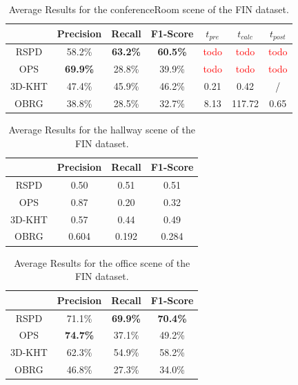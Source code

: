 \documentclass[main.tex]{subfiles}
\begin{document}
\begin{table}[]
    \centering
    \begin{tabular}{c|cccccc}
               & Precision       & Recall          & F1-Score        & $t_{pre}$             & $t_{calc}$            & $t_{post}$            \\ \hline
        RSPD   & 58.2\%          & \textbf{63.2\%} & \textbf{60.5\%} & \textcolor{red}{todo} & \textcolor{red}{todo} & \textcolor{red}{todo} \\
        OPS    & \textbf{69.9\%} & 28.8\%          & 39.9\%          & \textcolor{red}{todo} & \textcolor{red}{todo} & \textcolor{red}{todo} \\
        3D-KHT & 47.4\%          & 45.9\%          & 46.2\%          & 0.21                  & 0.42                  & /                     \\
        OBRG   & 38.8\%          & 28.5\%          & 32.7\%          & 8.13                  & 117.72                & 0.65
    \end{tabular}%
    \caption{Average Results for the conferenceRoom scene of the FIN dataset.}
    \label{tab:res-fin-conf}
\end{table}

\begin{table}[]
    \centering
    \begin{tabular}{c|ccc}
               & Precision & Recall & F1-Score \\ \hline
        RSPD   & 0.50      & 0.51   & 0.51     \\
        OPS    & 0.87      & 0.20   & 0.32     \\
        3D-KHT & 0.57      & 0.44   & 0.49     \\
        OBRG   & 0.604     & 0.192  & 0.284
    \end{tabular}%
    \caption{Average Results for the hallway scene of the FIN dataset.}
    \label{tab:res-fin-hall}
\end{table}

\begin{table}[]
    \centering
    \begin{tabular}{c|ccc}
               & Precision       & Recall          & F1-Score        \\ \hline
        RSPD   & 71.1\%          & \textbf{69.9\%} & \textbf{70.4\%} \\
        OPS    & \textbf{74.7\%} & 37.1\%          & 49.2\%          \\
        3D-KHT & 62.3\%          & 54.9\%          & 58.2\%          \\
        OBRG   & 46.8\%          & 27.3\%          & 34.0\%
    \end{tabular}
    \caption{Average Results for the office scene of the FIN dataset.}
    \label{tab:res-fin-off}
\end{table}
\end{document}
